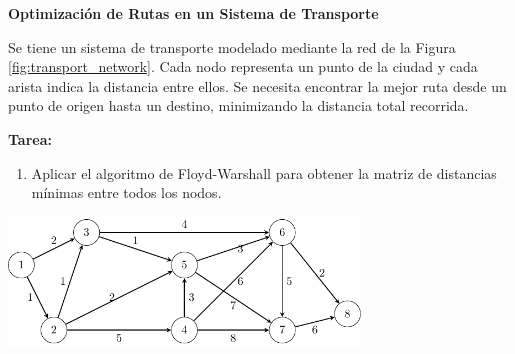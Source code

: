 \documentclass{article}
\begin{document}
\begin{problem}
\textbf{Optimización de Rutas en un Sistema de Transporte}

Se tiene un sistema de transporte modelado mediante la red de la Figura \ref{fig:transport_network}. Cada nodo representa un punto de la ciudad y cada arista indica la distancia entre ellos. Se necesita encontrar la mejor ruta desde un punto de origen hasta un destino, minimizando la distancia total recorrida.

\textbf{Tarea:}  
\begin{enumerate}
    \item Aplicar el algoritmo de Floyd-Warshall para obtener la matriz de distancias mínimas entre todos los nodos.
\end{enumerate}

\begin{center}
    \includegraphics[width=0.7\textwidth]{images/transport_network.pdf}
\end{center}
\label{fig:transport_network}
\end{problem}
\end{document}
